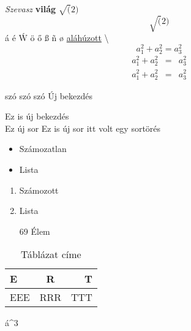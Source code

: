 \documentclass[]{article}
\begin{document}
\textit{Szevasz} \textbf{világ} $\sqrt(2)$
 $$\sqrt(2)$$
 \'a \'e \'W
 \"o
 \H{o}
 \ss
 \~n
 \o
 \underline{aláhúzott}
\textbackslash
\begin{equation}
	a_1^2+a_2^2=a_3^2\label{eq:equation}
\end{equation}
\begin{eqnarray}
	a_1^2+a_2^2&=&a_3^2\\
	a_1^2+a_2^2&=&a_3^2
\end{eqnarray}
\iffalse
Ez a rész egy komment
és többsoros.
\fi
\begin{flushleft}
	\blindtext
\end{flushleft}
\begin{center}
	\blindtext
\end{center}
szó  szó                    szó
Új bekezdés \par
Ez is új bekezdés\\
Ez új sor \newline
Ez is új sor \linebreak
itt volt egy sortörés
\begin{itemize}
	\item Számozatlan
	\item Lista
\end{itemize}
\begin{enumerate}
	\item Számozott 
	\item Lista
	\item[69] Élem
\end{enumerate}
\begin{table}
	\caption{Táblázat címe}
	\begin{tabular}{|l||cr|}
		E&R&T\\ \hline
		EEE&RRR&TTT\\ \hline
	\end{tabular}\label{tab:table}
\end{table}
\'a^3
\end{document}
